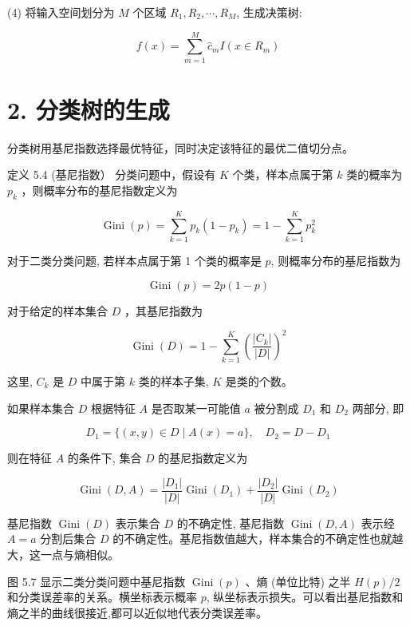 \documentclass[10pt]{article}
\begin{document}
\begin{CJK*}{UTF8}{bsmi}
(4) 将输入空间划分为 $M$ 个区域 $R_{1}, R_{2}, \cdots, R_{M}$, 生成决策树:

$$
f(x)=\sum_{m=1}^{M} \hat{c}_{m} I\left(x \in R_{m}\right)
$$

\section*{2. 分类树的生成}
分类树用基尼指数选择最优特征，同时决定该特征的最优二值切分点。

定义 5.4 (基尼指数） 分类问题中，假设有 $K$ 个类，样本点属于第 $k$ 类的概率为 $p_{k}$ ，则概率分布的基尼指数定义为


\begin{equation*}
\operatorname{Gini}(p)=\sum_{k=1}^{K} p_{k}\left(1-p_{k}\right)=1-\sum_{k=1}^{K} p_{k}^{2} \tag{5.22}
\end{equation*}


对于二类分类问题, 若样本点属于第 1 个类的概率是 $p$, 则概率分布的基尼指数为


\begin{equation*}
\operatorname{Gini}(p)=2 p(1-p) \tag{5.23}
\end{equation*}


对于给定的样本集合 $D$ ，其基尼指数为


\begin{equation*}
\operatorname{Gini}(D)=1-\sum_{k=1}^{K}\left(\frac{\left|C_{k}\right|}{|D|}\right)^{2} \tag{5.24}
\end{equation*}


这里, $C_{k}$ 是 $D$ 中属于第 $k$ 类的样本子集, $K$ 是类的个数。

如果样本集合 $D$ 根据特征 $A$ 是否取某一可能值 $a$ 被分割成 $D_{1}$ 和 $D_{2}$ 两部分, 即

$$
D_{1}=\{(x, y) \in D \mid A(x)=a\}, \quad D_{2}=D-D_{1}
$$

则在特征 $A$ 的条件下, 集合 $D$ 的基尼指数定义为


\begin{equation*}
\operatorname{Gini}(D, A)=\frac{\left|D_{1}\right|}{|D|} \operatorname{Gini}\left(D_{1}\right)+\frac{\left|D_{2}\right|}{|D|} \operatorname{Gini}\left(D_{2}\right) \tag{5.25}
\end{equation*}


基尼指数 $\operatorname{Gini}(D)$ 表示集合 $D$ 的不确定性, 基尼指数 $\operatorname{Gini}(D, A)$ 表示经 $A=a$ 分割后集合 $D$ 的不确定性。基尼指数值越大，样本集合的不确定性也就越大，这一点与熵相似。

图 5.7 显示二类分类问题中基尼指数 $\operatorname{Gini}(p)$ 、熵 (单位比特) 之半 $H(p) / 2$ 和分类误差率的关系。横坐标表示概率 $p$, 纵坐标表示损失。可以看出基尼指数和熵之半的曲线很接近,都可以近似地代表分类误差率。


\end{CJK*}
\end{document}
